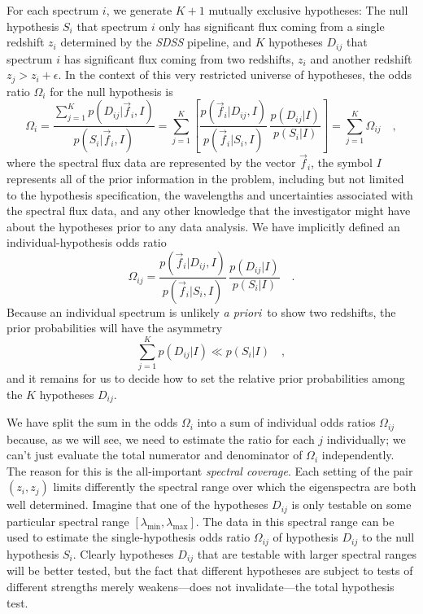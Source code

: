 \documentclass[12pt]{article}
\newcommand{\facility}[1]{\textsl{#1}}
\newcommand{\foreign}[1]{\textsl{#1}}
\newcommand{\apriori}{\foreign{a priori}}
\newcommand{\fluxvec}{\vec{f}}
\begin{document}
For each spectrum $i$, we generate $K+1$ mutually exclusive hypotheses:
The null hypothesis $S_i$ that spectrum $i$ only has significant flux
coming from a single redshift $z_i$ determined by the \facility{SDSS}
pipeline, and $K$ hypotheses $D_{ij}$ that spectrum $i$ has significant
flux coming from two redshifts, $z_i$ and another redshift
$z_j>z_i+\epsilon$.  In the context of this very restricted universe
of hypotheses, the odds ratio $\Omega_i$ for the null hypothesis is
\begin{equation}\label{eq:odds}
\Omega_i = \frac{\sum_{j=1}^K p(D_{ij}|\fluxvec_i,I)}{p(S_i|\fluxvec_i,I)}
 = \sum_{j=1}^K \left[\frac{p(\fluxvec_i|D_{ij},I)}{p(\fluxvec_i|S_i,I)}
 \,\frac{p(D_{ij}|I)}{p(S_i|I)}\right] = \sum_{j=1}^K\Omega_{ij}\quad,
\end{equation}
where the spectral flux data are represented by the vector
$\fluxvec_i$, the symbol $I$ represents all of the prior information
in the problem, including but not limited to the hypothesis
specification, the wavelengths and uncertainties associated with the
spectral flux data, and any other knowledge that the investigator
might have about the hypotheses prior to any data analysis.  We have
implicitly defined an individual-hypothesis odds ratio
\begin{equation}
\Omega_{ij} = \frac{p(\fluxvec_i|D_{ij},I)}{p(\fluxvec_i|S_i,I)}
  \,\frac{p(D_{ij}|I)}{p(S_i|I)}\quad.
\end{equation}
Because an individual spectrum is unlikely \apriori\ to show two
redshifts, the prior probabilities will have the asymmetry
\begin{equation}
\sum_{j=1}^K p(D_{ij}|I) \ll p(S_i|I) \quad,
\end{equation}
and it remains for us to decide how to set the relative prior
probabilities among the $K$ hypotheses $D_{ij}$.

We have split the sum in the odds $\Omega_i$ into a sum of individual
odds ratios $\Omega_{ij}$ because, as we will see, we need to estimate
the ratio for each $j$ individually; we can't just evaluate the total
numerator and denominator of $\Omega_i$ independently.  The reason for
this is the all-important \emph{spectral coverage}.  Each setting of
the pair $(z_i,z_j)$ limits differently the spectral range over which
the eigenspectra are both well determined.  Imagine that one of the
hypotheses $D_{ij}$ is only testable on some particular spectral range
$[\lambda_{\min},\lambda_{\max}]$.  The data in this spectral range
can be used to estimate the single-hypothesis odds ratio $\Omega_{ij}$
of hypothesis $D_{ij}$ to the null hypothesis $S_i$.  Clearly
hypotheses $D_{ij}$ that are testable with larger spectral ranges will
be better tested, but the fact that different hypotheses are subject
to tests of different strengths merely weakens---does not
invalidate---the total hypothesis test.
\end{document}
